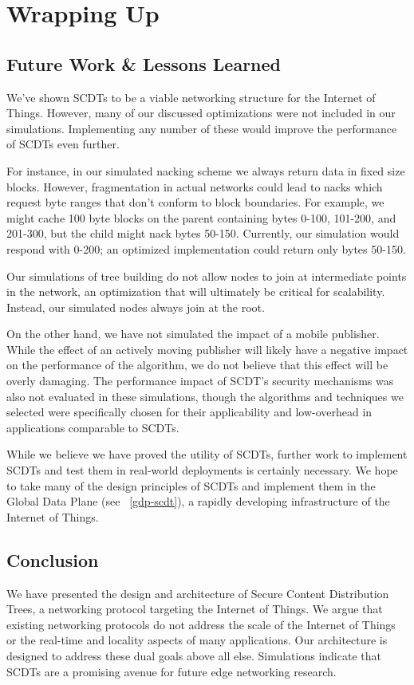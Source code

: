 \chapter{Wrapping Up}

\section{Future Work \& Lessons Learned}
We've shown SCDTs to be a viable networking structure for the Internet of Things. However, many of our discussed optimizations were not included in our simulations. Implementing any number of these would improve the performance of SCDTs even further. 

For instance, in our simulated nacking scheme we always return data in fixed size blocks. However, fragmentation in actual networks could lead to nacks which request byte ranges that don't conform to block boundaries. For example, we might cache 100 byte blocks on the parent containing bytes 0-100, 101-200, and 201-300, but the child might nack bytes 50-150.  Currently, our simulation would respond with 0-200; an optimized implementation could return only bytes 50-150.

Our simulations of tree building do not allow nodes to join at intermediate points in the network, an optimization that will ultimately be critical for scalability. Instead, our simulated nodes always join at the root.

On the other hand, we have not simulated the impact of a mobile publisher. While the effect of an actively moving publisher will likely have a negative impact on the performance of the algorithm, we do not believe that this effect will be overly damaging. The performance impact of SCDT's security mechanisms was also not evaluated in these simulations, though the algorithms and techniques we selected were specifically chosen for their applicability and low-overhead in applications comparable to SCDTs.

While we believe we have proved the utility of SCDTs, further work to implement SCDTs and test them in real-world deployments is certainly necessary. We hope to take many of the design principles of SCDTs and implement them in the Global Data Plane (see ~\autoref{gdp-scdt}), a rapidly developing infrastructure of the Internet of Things.

\section{Conclusion}
We have presented the design and architecture of Secure Content Distribution Trees, a networking protocol targeting the Internet of Things. We argue that existing networking protocols do not address the scale of the Internet of Things or the real-time and locality aspects of many applications. Our architecture is designed to address these dual goals above all else. Simulations indicate that SCDTs are a promising avenue for future edge networking research.

